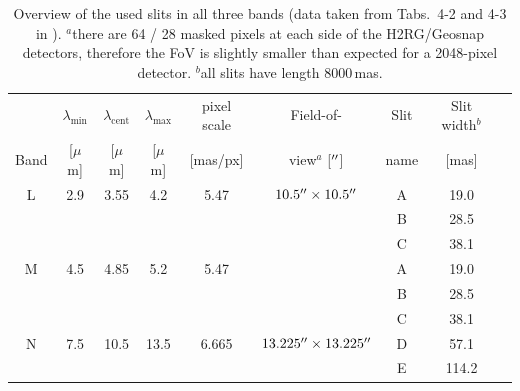 \begin{table}
\centering
\begin{tabular}{c|ccc|c:c|ccc}
     & $\lambda_\textrm{min}$ & $\lambda_\textrm{cent}$ & $\lambda_\textrm{max}$ & pixel scale & Field-of-       & Slit & Slit width$^b$        &\\
Band & [$\mu$m]               & [$\mu$m]                & [$\mu$m]               & [mas/px] & view$^a$ [$\hbox{$^{\prime\prime}$}$] & name &  [mas] & \\
\hline
L & 2.9 & 3.55 & 4.2  & 5.47 & $10.5\hbox{$^{\prime\prime}$}\times10.5\hbox{$^{\prime\prime}$}$ & A & 19.0  & \\
  &     &      &      &      & & B & 28.5  & \\
  &     &      &      &      & & C & 38.1  & \\
\hdashline
M & 4.5 & 4.85 & 5.2  & 5.47 & & A & 19.0  & \\
  &     &      &      &      & & B & 28.5  & \\
  &     &      &      &      & & C & 38.1  & \\
\hdashline
N & 7.5 & 10.5 & 13.5 & 6.665 &$13.225\hbox{$^{\prime\prime}$}\times13.225\hbox{$^{\prime\prime}$}$ & D & 57.1   &  \\
  &     &      &      &       & & E & 114.2  &  \\
\end{tabular}
\caption{Overview of the used slits in all three bands (data taken from Tabs.~4-2 and 4-3 in \cite{METIS-system_analysis}\label{tab:slit_props}).
\newline $^a$there are 64 / 28 masked pixels at each side of the H2RG/Geosnap detectors, therefore the \ac{FoV} is slightly smaller than expected for a 2048-pixel detector.
\newline $^b$all slits have length 8000\,mas.}
\end{table}



